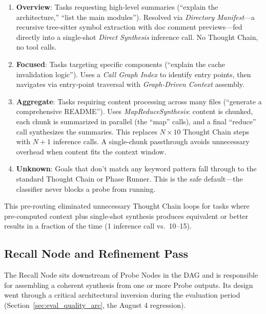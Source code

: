 \documentclass{article}
\begin{document}
\begin{enumerate}[leftmargin=*]
\item \textbf{Overview}: Tasks requesting high-level summaries (``explain the architecture,'' ``list the main modules'').
Resolved via \emph{Directory Manifest}---a recursive tree-sitter symbol extraction with doc comment previews---fed directly into a single-shot \emph{Direct Synthesis} inference call.
No Thought Chain, no tool calls.

\item \textbf{Focused}: Tasks targeting specific components (``explain the cache invalidation logic'').
Uses a \emph{Call Graph Index} to identify entry points, then navigates via entry-point traversal with \emph{Graph-Driven Context} assembly.

\item \textbf{Aggregate}: Tasks requiring content processing across many files (``generate a comprehensive README'').
Uses \emph{MapReduceSynthesis}: content is chunked, each chunk is summarized in parallel (the ``map'' calls), and a final ``reduce'' call synthesizes the summaries.
This replaces $N \times 10$ Thought Chain steps with $N + 1$ inference calls.
A single-chunk passthrough avoids unnecessary overhead when content fits the context window.

\item \textbf{Unknown}: Goals that don't match any keyword pattern fall through to the standard Thought Chain or Phase Runner.
This is the safe default---the classifier never blocks a probe from running.
\end{enumerate}

This pre-routing eliminated unnecessary Thought Chain loops for tasks where pre-computed context plus single-shot synthesis produces equivalent or better results in a fraction of the time (1 inference call vs.\ 10--15).

\subsection{Recall Node and Refinement Pass}
\label{sec:recall_node}

The Recall Node sits downstream of Probe Nodes in the DAG and is responsible for assembling a coherent synthesis from one or more Probe outputs.
Its design went through a critical architectural inversion during the evaluation period (Section~\ref{sec:eval_quality_arc}, the August 4 regression).
\end{document}
